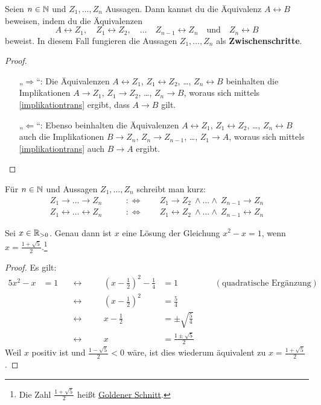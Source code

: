 \begin{satz} \label{ifftrans}
    Seien $n\in\mathbb N$ und $Z_1,\dots , Z_n$ Aussagen. Dann kannst du die Äquivalenz $A\leftrightarrow B$ beweisen, indem du die Äquivalenzen
        \[ A\leftrightarrow Z_1,\quad Z_1\leftrightarrow Z_2,\quad \dots\quad Z_{n-1}\leftrightarrow Z_n \quad\text{und}\quad Z_n\leftrightarrow B \]
    beweist. In diesem Fall fungieren die Aussagen $Z_1,\dots , Z_n$ als \textbf{Zwischenschritte}.
\end{satz}
\begin{proof}
    \begin{enumerate}
        \item[„$\Rightarrow$“:] Die Äquivalenzen $A\leftrightarrow Z_1$, $Z_1\leftrightarrow Z_2$, \dots, $Z_n\leftrightarrow B$ beinhalten die Implikationen $A\to Z_1$, $Z_1\to Z_2$, \dots, $Z_n\to B$, woraus sich mittels \cref{implikationtrans} ergibt, dass $A\to B$ gilt.
        \item[„$\Leftarrow$“:] Ebenso beinhalten die Äquivalenzen $A\leftrightarrow Z_1$, $Z_1\leftrightarrow Z_2$, \dots, $Z_n\leftrightarrow B$ auch die Implikationen $B\to Z_n$, $Z_n\to Z_{n-1}$, \dots, $Z_1\to A$, woraus sich mittels \cref{implikationtrans} auch $B\to A$ ergibt. \qedhere
    \end{enumerate}
\end{proof}


\begin{nota}[*] \label{todotsto}
    Für $n\in \mathbb N$ und Aussagen $Z_1,\dots , Z_n$ schreibt man kurz:
    \begin{align*}
        Z_1\to \ldots \to Z_n \qquad &:\Leftrightarrow\qquad Z_1\to Z_2\ \land \ldots \land\ Z_{n-1}\to Z_n \\
        Z_1\leftrightarrow \ldots \leftrightarrow Z_n \qquad &:\Leftrightarrow\qquad Z_1\leftrightarrow Z_2\ \land \ldots \land\ Z_{n-1}\leftrightarrow Z_n
    \end{align*}
\end{nota}


\begin{bsp}[*]
    Sei $x\in \mathbb R_{>0}$. Genau dann ist $x$ eine Lösung der Gleichung $x^2-x=1$, wenn $x= \frac{1+\sqrt{5}}{2}$.\footnote{Die Zahl $\frac{1+\sqrt{5}}{2}$ heißt \href{https://de.wikipedia.org/wiki/Goldener_Schnitt}{Goldener Schnitt}.}
\end{bsp}
\begin{proof}
    Es gilt:
    \begin{alignat*}{5}
        x^2-x& =1 \quad&\leftrightarrow\quad&& \left(x-\frac{1}{2}\right)^2 - \frac{1}{4} &= 1 &&& (\text{quadratische Ergänzung}) \\
        && \leftrightarrow\quad&& \left(x-\frac{1}{2}\right)^2&=\frac{5}{4} \\
        && \leftrightarrow\quad&& x-\frac{1}{2} &= \pm \sqrt{\frac{5}{4}} \\
        && \leftrightarrow\quad&& x  &= \frac{1\pm \sqrt{5}}{2} 
    \end{alignat*}
    Weil $x$ positiv ist und $\frac{1-\sqrt{5}}{2}<0$ wäre, ist dies wiederum äquivalent zu $x=\frac{1+\sqrt{5}}{2}$.
\end{proof}


